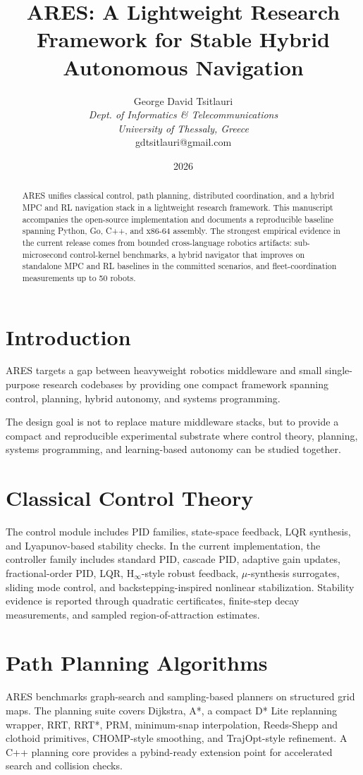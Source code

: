 \documentclass[letterpaper, 10 pt, conference]{ieeeconf}
\title{ARES: A Lightweight Research Framework for Stable Hybrid Autonomous Navigation}
\author{George David Tsitlauri\\
\textit{Dept. of Informatics \& Telecommunications}\\
\textit{University of Thessaly, Greece}\\
gdtsitlauri@gmail.com}
\date{2026}
\begin{document}
\maketitle

\begin{abstract}
ARES unifies classical control, path planning, distributed coordination, and a
hybrid MPC and RL navigation stack in a lightweight research framework. This
manuscript accompanies the open-source implementation and documents a
reproducible baseline spanning Python, Go, C++, and x86-64 assembly. The
strongest empirical evidence in the current release comes from bounded
cross-language robotics artifacts: sub-microsecond control-kernel benchmarks, a
hybrid navigator that improves on standalone MPC and RL baselines in the
committed scenarios, and fleet-coordination measurements up to 50 robots.
\end{abstract}

\section{Introduction}
ARES targets a gap between heavyweight robotics middleware and small
single-purpose research codebases by providing one compact framework spanning
control, planning, hybrid autonomy, and systems programming.

The design goal is not to replace mature middleware stacks, but to provide a
compact and reproducible experimental substrate where control theory, planning,
systems programming, and learning-based autonomy can be studied together.

\section{Classical Control Theory}
The control module includes PID families, state-space feedback, LQR synthesis,
and Lyapunov-based stability checks. In the current implementation, the
controller family includes standard PID, cascade PID, adaptive gain updates,
fractional-order PID, LQR, H$_\infty$-style robust feedback, $\mu$-synthesis
surrogates, sliding mode control, and backstepping-inspired nonlinear
stabilization. Stability evidence is reported through quadratic certificates,
finite-step decay measurements, and sampled region-of-attraction estimates.

\section{Path Planning Algorithms}
ARES benchmarks graph-search and sampling-based planners on structured grid
maps. The planning suite covers Dijkstra, A*, a compact D* Lite replanning
wrapper, RRT, RRT*, PRM, minimum-snap interpolation, Reeds-Shepp and clothoid
primitives, CHOMP-style smoothing, and TrajOpt-style refinement. A C++ planning
core provides a pybind-ready extension point for accelerated search and
collision checks.
\end{document}
